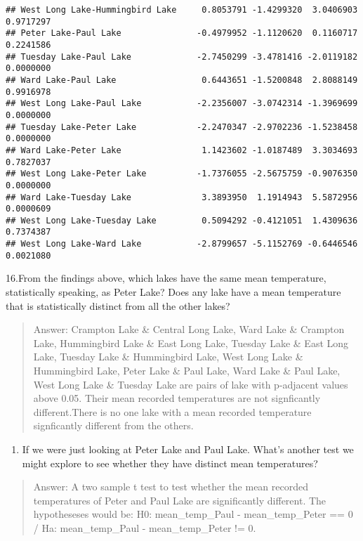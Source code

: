 \documentclass[
]{article}
\providecommand{\tightlist}{%
  \setlength{\itemsep}{0pt}\setlength{\parskip}{0pt}}
\begin{document}
\begin{verbatim}
## West Long Lake-Hummingbird Lake     0.8053791 -1.4299320  3.0406903 0.9717297
## Peter Lake-Paul Lake               -0.4979952 -1.1120620  0.1160717 0.2241586
## Tuesday Lake-Paul Lake             -2.7450299 -3.4781416 -2.0119182 0.0000000
## Ward Lake-Paul Lake                 0.6443651 -1.5200848  2.8088149 0.9916978
## West Long Lake-Paul Lake           -2.2356007 -3.0742314 -1.3969699 0.0000000
## Tuesday Lake-Peter Lake            -2.2470347 -2.9702236 -1.5238458 0.0000000
## Ward Lake-Peter Lake                1.1423602 -1.0187489  3.3034693 0.7827037
## West Long Lake-Peter Lake          -1.7376055 -2.5675759 -0.9076350 0.0000000
## Ward Lake-Tuesday Lake              3.3893950  1.1914943  5.5872956 0.0000609
## West Long Lake-Tuesday Lake         0.5094292 -0.4121051  1.4309636 0.7374387
## West Long Lake-Ward Lake           -2.8799657 -5.1152769 -0.6446546 0.0021080
\end{verbatim}

16.From the findings above, which lakes have the same mean temperature,
statistically speaking, as Peter Lake? Does any lake have a mean
temperature that is statistically distinct from all the other lakes?

\begin{quote}
Answer: Crampton Lake \& Central Long Lake, Ward Lake \& Crampton Lake,
Hummingbird Lake \& East Long Lake, Tuesday Lake \& East Long Lake,
Tuesday Lake \& Hummingbird Lake, West Long Lake \& Hummingbird Lake,
Peter Lake \& Paul Lake, Ward Lake \& Paul Lake, West Long Lake \&
Tuesday Lake are pairs of lake with p-adjacent values above 0.05. Their
mean recorded temperatures are not signficantly different.There is no
one lake with a mean recorded temperature signficantly different from
the others.
\end{quote}

\begin{enumerate}
\def\labelenumi{\arabic{enumi}.}
\setcounter{enumi}{16}
\tightlist
\item
  If we were just looking at Peter Lake and Paul Lake. What's another
  test we might explore to see whether they have distinct mean
  temperatures?
\end{enumerate}

\begin{quote}
Answer: A two sample t test to test whether the mean recorded
temperatures of Peter and Paul Lake are significantly different. The
hypotheseses would be: H0: mean\_temp\_Paul - mean\_temp\_Peter == 0 /
Ha: mean\_temp\_Paul - mean\_temp\_Peter != 0.
\end{quote}
\end{document}
